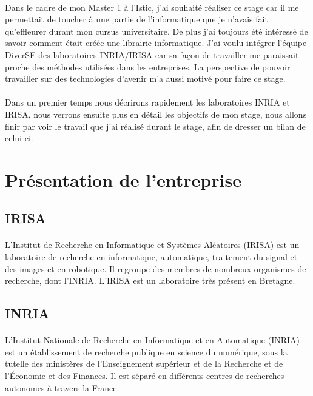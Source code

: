 \documentclass[11pt, a4paper, pdftex]{article}
\begin{document}
        \paragraph{}
            Dans le cadre de mon Master 1 à l'Istic, j'ai souhaité réaliser ce stage car il me permettait de toucher à une partie de l'informatique que je n'avais
            fait qu'effleurer durant mon cursus universitaire.
            De plus j'ai toujours été intéressé de savoir comment était créée une librairie informatique.
            J'ai voulu intégrer l'équipe DiverSE des laboratoires INRIA/IRISA car sa façon de travailler me paraissait proche des méthodes utilisées dans les entreprises.
            La perspective de pouvoir travailler sur des technologies d'avenir m'a aussi motivé pour faire ce stage.

        \paragraph{}
            Dans un premier temps nous décrirons rapidement les laboratoires INRIA et IRISA, nous verrons ensuite plus en détail les objectifs de mon stage,
            nous allons finir par voir le travail que j'ai réalisé durant le stage, afin de dresser un bilan de celui-ci.
    \newpage
    \section{Présentation de l'entreprise}\label{sec:presentr}
    \vspace{1cm}
    \subsection{IRISA}\label{subsec:irisa}
        \paragraph{}
            L'Institut de Recherche en Informatique et Systèmes Aléatoires (IRISA) est un laboratoire de recherche en informatique, automatique,
            traitement du signal et des images et en robotique. Il regroupe des membres de nombreux organismes de recherche, dont l'INRIA\@.
            L'IRISA est un laboratoire très présent en Bretagne.
    \vspace{1cm}
    \subsection{INRIA}\label{subsec:inria}
        \paragraph{}
            L'Institut Nationale de Recherche en Informatique et en Automatique (INRIA) est un établissement de recherche publique en science du numérique,
            sous la tutelle des ministères de l'Enseignement supérieur et de la Recherche et de l'Économie et des Finances.
            Il est séparé en différents centres de recherches autonomes à travers la France.
    \vspace{1cm}
\end{document}
